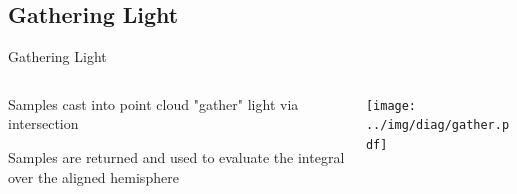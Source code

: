 \documentclass[10pt,compress,professionalfont]{beamer}
\begin{document}
\subsection{Gathering Light}
\begin{frame}{Gathering Light}

    \begin{columns}
        \begin{column}{0.5\textwidth}

    \vspace{-5mm}
    Samples cast into point cloud "gather" light via intersection\\
    \vspace{8mm}

    Samples are returned and used to evaluate the integral over the aligned hemisphere

        \end{column}
        \begin{column}{0.5\textwidth}
            \texttt{[image: ../img/diag/gather.pdf]}\\
            \vspace{-4mm}
        \end{column}
    \end{columns}
    

\end{frame}
\end{document}
